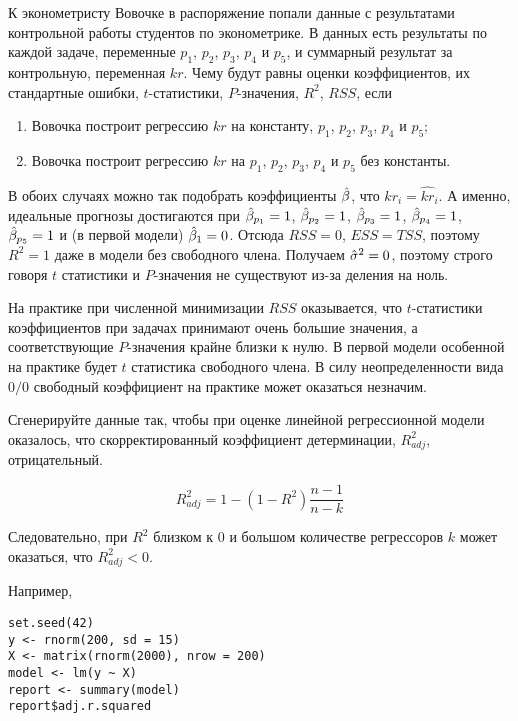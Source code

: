 \begin{problem}
К эконометристу Вовочке в распоряжение попали данные с результатами контрольной работы студентов по эконометрике. В данных есть результаты по каждой задаче, переменные $p_1$, $p_2$, $p_3$, $p_4$ и $p_5$, и суммарный результат за контрольную, переменная $kr$. Чему будут равны оценки коэффициентов, их стандартные ошибки, $t$-статистики, $P$-значения, $R^2$, $RSS$, если
\begin{enumerate}
\item Вовочка построит регрессию $kr$ на константу, $p_1$, $p_2$, $p_3$, $p_4$ и $p_5$;
\item Вовочка построит регрессию $kr$ на $p_1$, $p_2$, $p_3$, $p_4$ и $p_5$ без константы.
\end{enumerate}


\begin{sol}
В обоих случаях можно так подобрать коэффициенты $\hat{\beta}$, что $kr_i=\widehat{kr}_i$. А именно, идеальные прогнозы достигаются при  $\hat{\beta}_{p_1}=1$, $\hat{\beta}_{p_2}=1$, $\hat{\beta}_{p_3}=1$, $\hat{\beta}_{p_4}=1$, $\hat{\beta}_{p_5}=1$ и (в первой модели) $\hat{\beta}_1=0$. Отсюда $RSS=0$, $ESS=TSS$, поэтому $R^2=1$ даже в модели без свободного члена. Получаем $\hat{\sigma}^2=0$, поэтому строго говоря $t$ статистики и $P$-значения не существуют из-за деления на ноль.

На практике при численной минимизации $RSS$ оказывается, что $t$-статистики коэффициентов при задачах принимают очень большие значения, а соответствующие $P$-значения крайне близки к нулю. В первой модели особенной на практике будет $t$ статистика свободного члена. В силу неопределенности вида $0/0$ свободный коэффициент на практике может оказаться незначим.
\end{sol}
\end{problem}





\begin{problem}
Сгенерируйте данные так, чтобы при оценке линейной регрессионной модели оказалось, что скорректированный коэффициент детерминации, $R^2_{adj}$, отрицательный.

\begin{sol}

\[ R^2_{adj}=1-(1-R^2)\frac{n-1}{n-k} \]

Следовательно, при $R^2$ близком к 0 и большом количестве регрессоров $k$ может оказаться, что $R^2_{adj}<0$.

Например,

\begin{verbatim}
set.seed(42)
y <- rnorm(200, sd = 15)
X <- matrix(rnorm(2000), nrow = 200)
model <- lm(y ~ X)
report <- summary(model)
report$adj.r.squared
\end{verbatim}

\end{sol}
\end{problem}



